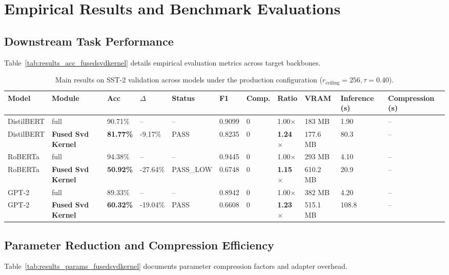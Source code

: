 \section{Empirical Results and Benchmark Evaluations}

\subsection{Downstream Task Performance}
Table~\ref{tab:results_acc_fusedsvdkernel} details empirical evaluation metrics across target backbones.

\begin{table}[t]
\centering
\small
\begin{tabular}{lllllllllll}
\toprule
\textbf{Model} & \textbf{Module} & \textbf{Acc} & \textbf{$\Delta$} & \textbf{Status} & \textbf{F1} & \textbf{Comp.} & \textbf{Ratio} & \textbf{VRAM} & \textbf{Inference (s)} & \textbf{Compression (s)} \\
\midrule
DistilBERT & full & 90.71\% & -- & -- & 0.9099 & 0 & 1.00$\times$ & 183 MB & 1.90 & -- \\
DistilBERT & \textbf{Fused Svd Kernel} & \textbf{81.77\%} & -9.17\% & PASS & 0.8235 & 0 & \textbf{1.24$\times$} & 177.6 MB & 80.3 & -- \\
RoBERTa & full & 94.38\% & -- & -- & 0.9445 & 0 & 1.00$\times$ & 293 MB & 4.10 & -- \\
RoBERTa & \textbf{Fused Svd Kernel} & \textbf{50.92\%} & -27.64\% & PASS\_LOW & 0.6748 & 0 & \textbf{1.15$\times$} & 610.2 MB & 20.9 & -- \\
GPT-2 & full & 89.33\% & -- & -- & 0.8942 & 0 & 1.00$\times$ & 382 MB & 4.20 & -- \\
GPT-2 & \textbf{Fused Svd Kernel} & \textbf{60.32\%} & -19.04\% & PASS & 0.6608 & 0 & \textbf{1.23$\times$} & 515.1 MB & 108.8 & -- \\
\bottomrule
\end{tabular}
\caption{Main results on SST-2 validation across models under the production configuration ($r_{\mathrm{ceiling}}=256, \tau=0.40$).}
\label{tab:main_sst2}
\end{table}

\subsection{Parameter Reduction and Compression Efficiency}
Table~\ref{tab:results_params_fusedsvdkernel} documents parameter compression factors and adapter overhead.

